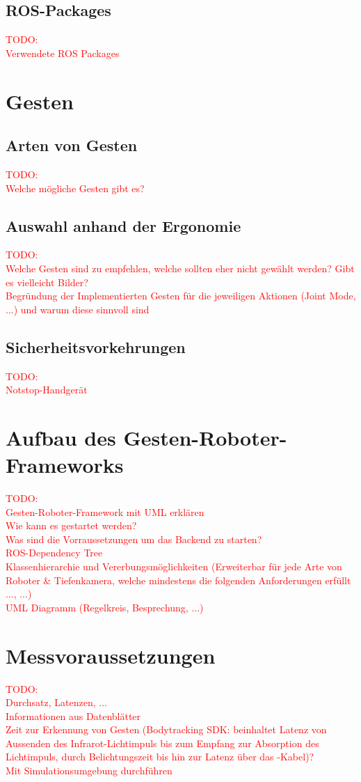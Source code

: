 \subsection{ROS-Packages}
\textcolor{red}{TODO:\\
Verwendete ROS Packages
}


\section{Gesten}


\subsection{Arten von Gesten}
\textcolor{red}{TODO:\\
Welche mögliche Gesten gibt es?
}

\subsection{Auswahl anhand der Ergonomie}
\textcolor{red}{TODO:\\
Welche Gesten sind zu empfehlen, welche sollten eher nicht gewählt werden? Gibt es vielleicht Bilder?\\
Begründung der Implementierten Gesten für die jeweiligen Aktionen (Joint Mode, ...) und warum diese sinnvoll sind
}

\subsection{Sicherheitsvorkehrungen}
\textcolor{red}{TODO:\\
Notstop-Handgerät
}


\section{Aufbau des Gesten-Roboter-Frameworks}
\textcolor{red}{TODO:\\
Gesten-Roboter-Framework mit UML erklären\\
Wie kann es gestartet werden?\\
Was sind die Vorraussetzungen um das Backend zu starten?\\
ROS-Dependency Tree\\
Klassenhierarchie und Vererbungsmöglichkeiten (Erweiterbar für jede Arte von Roboter \& Tiefenkamera, welche mindestens die folgenden Anforderungen erfüllt ..., ...)\\
UML Diagramm (Regelkreis, Besprechung, ...)
}


\section{Messvoraussetzungen}
\textcolor{red}{TODO:\\
Durchsatz, Latenzen, ...\\
Informationen aus Datenblätter\\
Zeit zur Erkennung von Gesten (Bodytracking SDK: beinhaltet Latenz von Aussenden des Infrarot-Lichtimpuls bis zum Empfang zur Absorption des Lichtimpuls, durch Belichtungszeit bis hin zur Latenz über das -Kabel)?\\
Mit Simulationsumgebung durchführen
}
